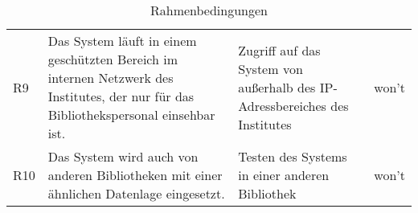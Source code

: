\begin{table}[h]
\begin{adjustbox}{max width=\textwidth}
\begin{tabular}{lp{6.5cm}p{6.5cm}l}
        R9                                &Das System läuft in einem geschützten Bereich im internen Netzwerk des Institutes, der nur für das Bibliothekspersonal einsehbar ist. & Zugriff auf das System von außerhalb des IP-Adressbereiches des Institutes  & won't\\
        R10                              &Das System wird auch von anderen Bibliotheken mit einer ähnlichen Datenlage eingesetzt. & Testen des Systems in einer anderen Bibliothek & won't\\
       \bottomrule
    \end{tabular}
    \end{adjustbox}
    \caption{%
        Rahmenbedingungen
    }
    \label{tab:Rahmenbedingungen}
    \end{table}
\endgroup









